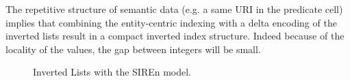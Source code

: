 The repetitive structure of semantic data (e.g. a same URI in the predicate
cell) implies that combining the entity-centric indexing with a delta encoding
of the inverted lists result in a compact inverted index structure. Indeed
because of the locality of the values, the gap between integers will be small.

\begin{figure}
\centering
{}%
\caption{Inverted Lists with the SIREn model.}
\label{fig:siren-inv-lists}
\end{figure}
